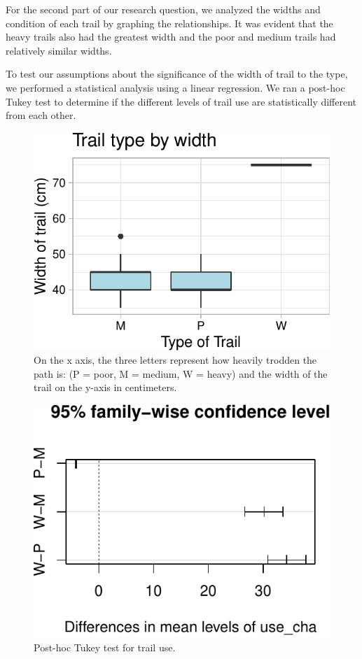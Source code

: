 \documentclass[12pt,]{article}
\begin{document}
For the second part of our research question, we analyzed the widths and
condition of each trail by graphing the relationships. It was evident
that the heavy trails also had the greatest width and the poor and
medium trails had relatively similar widths.

To test our assumptions about the significance of the width of trail to
the type, we performed a statistical analysis using a linear regression.
We ran a post-hoc Tukey test to determine if the different levels of
trail use are statistically different from each other.

\begin{figure}

\includegraphics{Project_Template_files/figure-latex/plots by width-1} \hfill{}

\caption{On the x axis, the three letters represent how heavily trodden the path is:  (P = poor, M = medium, W = heavy) and the width of the trail on the y-axis in centimeters.}\label{fig:plots by width}
\end{figure}

\begin{figure}

\includegraphics{Project_Template_files/figure-latex/unnamed-chunk-3-1} \hfill{}

\caption{Post-hoc Tukey test for trail use.}\label{fig:unnamed-chunk-3}
\end{figure}
\end{document}
